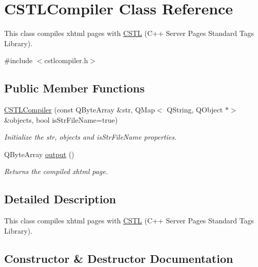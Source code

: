 \hypertarget{class_c_s_t_l_compiler}{}\section{C\+S\+T\+L\+Compiler Class Reference}
\label{class_c_s_t_l_compiler}


This class compiles xhtml pages with \hyperlink{namespace_c_s_t_l}{C\+S\+TL} (C++ Server Pages Standard Tags Library).  




{\ttfamily \#include $<$cstlcompiler.\+h$>$}

\subsection*{Public Member Functions}
\begin{DoxyCompactItemize}
\item 
\hyperlink{class_c_s_t_l_compiler_ad29e2a98129d37e8b4f332f93a66736c}{C\+S\+T\+L\+Compiler} (const Q\+Byte\+Array \&str, Q\+Map$<$ Q\+String, Q\+Object $\ast$$>$ \&objects, bool is\+Str\+File\+Name=true)
\begin{DoxyCompactList}\small\item\em Initialize the str, objects and is\+Str\+File\+Name properties. \end{DoxyCompactList}\item 
Q\+Byte\+Array \hyperlink{class_c_s_t_l_compiler_a3cce5a503e81c5de099859fe0ae1c386}{output} ()
\begin{DoxyCompactList}\small\item\em Returns the compiled xhtml page. \end{DoxyCompactList}\end{DoxyCompactItemize}


\subsection{Detailed Description}
This class compiles xhtml pages with \hyperlink{namespace_c_s_t_l}{C\+S\+TL} (C++ Server Pages Standard Tags Library). 

\subsection{Constructor \& Destructor Documentation}
\mbox{\label{class_c_s_t_l_compiler_ad29e2a98129d37e8b4f332f93a66736c}} 
